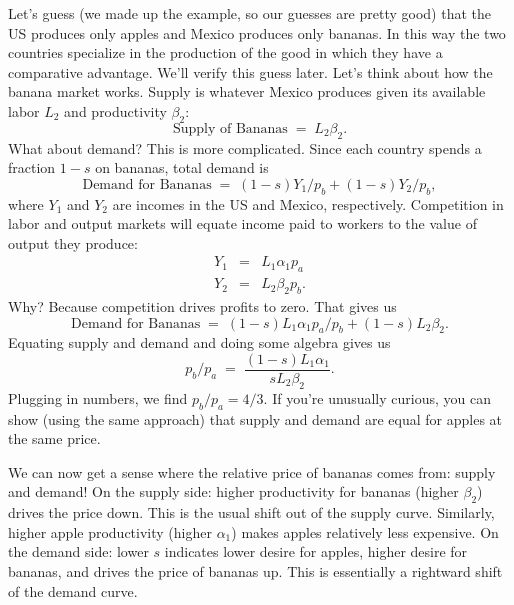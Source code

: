 \documentclass[letterpaper,12pt]{article}
\begin{document}
Let's guess (we made up the example, so our guesses are pretty good)
that the US produces only apples and  Mexico produces only bananas.
In this way the two countries specialize in the
production of the good in which they have a comparative advantage.
We'll verify this guess later.
Let's think about how the banana market works.
Supply is whatever Mexico produces given its
available labor $L_2$ and productivity $\beta_2$:
\[
    \mbox{Supply of Bananas}  \;=\;  L_2 \beta_2  .
\]
What about demand?  This is more complicated.
Since each country spends a fraction $1-s$ on bananas,
total demand is
\[
    \mbox{Demand for Bananas}  \;=\;  (1-s) Y_1/p_b + (1-s) Y_2/p_b ,
\]
where $Y_1$ and $Y_2$ are incomes in the US and Mexico,
respectively.
Competition in labor and output markets will equate
income paid to workers to the value of output they produce:
\begin{eqnarray*}
    Y_1 &=&  L_1 \alpha_1 p_a \\
    Y_2 &=& L_2 \beta_2 p_b .
\end{eqnarray*}
Why?  Because competition drives profits to zero.
That gives us
\[
    \mbox{Demand for Bananas}  \;=\;  (1-s) L_1 \alpha_1 p_a/p_b
                + (1-s) L_2 \beta_2  .
\]
Equating supply and demand and doing some algebra gives us
\begin{equation}
    p_b/p_a  \;=\;  \frac{ (1-s) L_1 \alpha_1 }{ s L_2 \beta_2 } .
    \label{eq:equilprice}
\end{equation}
Plugging in numbers, we find $ p_b/p_a = 4/3 $.
If you're unusually curious,
you can show (using the same approach)
that supply and demand are equal for apples at the same price.


We can now get a sense where the relative price
of bananas comes from:  supply and demand!
On the supply side:  higher productivity for bananas (higher $\beta_2$)
drives the price down.
This is the usual shift out of the supply curve.
Similarly, higher apple productivity (higher $\alpha_1$)
makes apples relatively less expensive.
On the demand side:  lower  $s$ indicates lower desire for apples,
higher desire for bananas, and drives the price of bananas up.
This is essentially a rightward shift of the demand curve.
\end{document}
